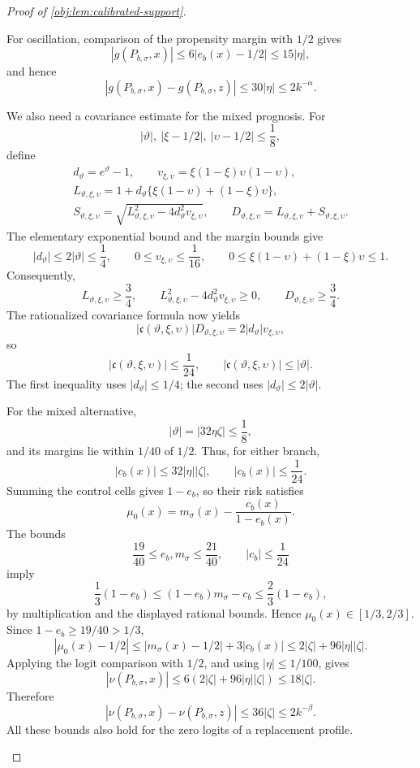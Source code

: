 \begin{proof}[Proof of \cref{obj:lem:calibrated-support}]
\begin{enumerate}
For oscillation, comparison of the propensity margin with \(1/2\) gives
\[
|g(P_{b,\sigma},x)|
\le6|e_b(x)-1/2|\le15|\eta|,
\]
and hence
\[
|g(P_{b,\sigma},x)-g(P_{b,\sigma},z)|
\le30|\eta|
\le2k^{-\alpha}.
\]

We also need a covariance estimate for the mixed prognosis. For
\[
|\vartheta|,\ |\xi-1/2|,\ |\upsilon-1/2|\le\frac18,
\]
define
\[
\begin{gathered}
d_\vartheta=e^\vartheta-1,\qquad
v_{\xi,\upsilon}=\xi(1-\xi)\upsilon(1-\upsilon),\\
L_{\vartheta,\xi,\upsilon}
=1+d_\vartheta\{\xi(1-\upsilon)+(1-\xi)\upsilon\},\\
S_{\vartheta,\xi,\upsilon}
=\sqrt{L_{\vartheta,\xi,\upsilon}^2
              -4d_\vartheta^2v_{\xi,\upsilon}},\qquad
D_{\vartheta,\xi,\upsilon}
=L_{\vartheta,\xi,\upsilon}+S_{\vartheta,\xi,\upsilon}.
\end{gathered}
\]
The elementary exponential bound and the margin bounds give
\[
|d_\vartheta|\le2|\vartheta|\le\frac14,\qquad
0\le v_{\xi,\upsilon}\le\frac1{16},\qquad
0\le\xi(1-\upsilon)+(1-\xi)\upsilon\le1.
\]
Consequently,
\[
L_{\vartheta,\xi,\upsilon}\ge\frac34,\qquad
L_{\vartheta,\xi,\upsilon}^2
       -4d_\vartheta^2v_{\xi,\upsilon}\ge0,
\qquad
D_{\vartheta,\xi,\upsilon}\ge\frac34.
\]
The rationalized covariance formula now yields
\[
|\mathfrak c(\vartheta,\xi,\upsilon)|
D_{\vartheta,\xi,\upsilon}
=2|d_\vartheta|v_{\xi,\upsilon},
\]
so
\[
|\mathfrak c(\vartheta,\xi,\upsilon)|
\le\frac1{24},
\qquad
|\mathfrak c(\vartheta,\xi,\upsilon)|
\le|\vartheta|.
\]
The first inequality uses \(|d_\vartheta|\le1/4\); the second uses
\(|d_\vartheta|\le2|\vartheta|\).

For the mixed alternative,
\[
|\vartheta|=|32\eta\zeta|\le\frac18,
\]
and its margins lie within \(1/40\) of \(1/2\). Thus, for either branch,
\[
|c_b(x)|\le32|\eta||\zeta|,
\qquad |c_b(x)|\le\frac1{24}.
\]
Summing the control cells gives \(1-e_b\), so their risk satisfies
\[
\mu_0(x)=m_\sigma(x)-\frac{c_b(x)}{1-e_b(x)}.
\]
The bounds
\[
\frac{19}{40}\le e_b,m_\sigma\le\frac{21}{40},
\qquad |c_b|\le\frac1{24}
\]
imply
\[
\frac13(1-e_b)\le(1-e_b)m_\sigma-c_b
                 \le\frac23(1-e_b),
\]
by multiplication and the displayed rational bounds. Hence
\(\mu_0(x)\in[1/3,2/3]\). Since \(1-e_b\ge19/40>1/3\),
\[
|\mu_0(x)-1/2|
\le|m_\sigma(x)-1/2|+3|c_b(x)|
\le2|\zeta|+96|\eta||\zeta|.
\]
Applying the logit comparison with \(1/2\), and using \(|\eta|\le1/100\), gives
\[
|\nu(P_{b,\sigma},x)|
\le6(2|\zeta|+96|\eta||\zeta|)
\le18|\zeta|.
\]
Therefore
\[
|\nu(P_{b,\sigma},x)-\nu(P_{b,\sigma},z)|
\le36|\zeta|\le2k^{-\beta}.
\]
All these bounds also hold for the zero logits of a replacement profile.


\end{enumerate}
\end{proof}
